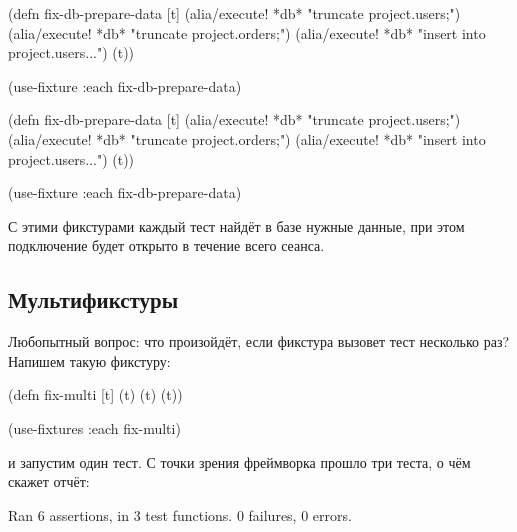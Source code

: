 
\ifx\DEVICETYPE\MOBILE

\begin{english}
  \begin{clojure}
(defn fix-db-prepare-data [t]
  (alia/execute! *db*
    "truncate project.users;")
  (alia/execute! *db*
    "truncate project.orders;")
  (alia/execute! *db*
    "insert into project.users...")
  (t))

(use-fixture :each fix-db-prepare-data)
  \end{clojure}
\end{english}

\else

\begin{english}
  \begin{clojure}
(defn fix-db-prepare-data [t]
  (alia/execute! *db* "truncate project.users;")
  (alia/execute! *db* "truncate project.orders;")
  (alia/execute! *db* "insert into project.users...")
  (t))

(use-fixture :each fix-db-prepare-data)
  \end{clojure}
\end{english}

\fi

С этими фикстурами каждый тест найдёт в базе нужные данные, при этом подключение
будет открыто в течение всего сеанса.

\subsection{Мультификстуры}

\label{multi-fixture}


Любопытный вопрос: что произойдёт, если фикстура вызовет тест несколько раз?
Напишем такую фикстуру:

\begin{english}
  \begin{clojure}
(defn fix-multi [t]
  (t) (t) (t))

(use-fixtures :each fix-multi)
  \end{clojure}
\end{english}

\noindent
и запустим один тест. С точки зрения фреймворка прошло три теста, о чём скажет
отчёт:

\ifx\DEVICETYPE\MOBILE

\begin{english}
  \begin{text}
Ran 6 assertions, in 3 test functions.
0 failures, 0 errors.
  \end{text}
\end{english}

